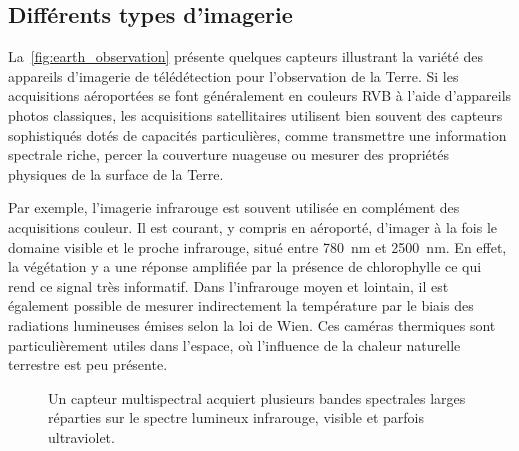 \subsection{Différents types d'imagerie}

La~\cref{fig:earth_observation} présente quelques capteurs illustrant la variété des appareils d'imagerie de télédétection pour l'observation de la Terre. Si les acquisitions aéroportées se font généralement en couleurs \gls{RVB} à l'aide d'appareils photos classiques, les acquisitions satellitaires utilisent bien souvent des capteurs sophistiqués dotés de capacités particulières, comme transmettre une information spectrale riche, percer la couverture nuageuse ou mesurer des propriétés physiques de la surface de la Terre.

Par exemple, l'imagerie infrarouge est souvent utilisée en complément des acquisitions couleur. Il est courant, y compris en aéroporté, d'imager à la fois le domaine visible et le proche infrarouge, situé entre \SI{780}{\nano\meter} et \SI{2 500}{\nano\meter}. En effet, la végétation y a une réponse amplifiée par la présence de chlorophylle ce qui rend ce signal très informatif. Dans l'infrarouge moyen et lointain, il est également possible de mesurer indirectement la température par le biais des radiations lumineuses émises selon la loi de Wien. Ces caméras thermiques sont particulièrement utiles dans l'espace, où l'influence de la chaleur naturelle terrestre est peu présente.

\begin{figure}
  \resizebox{\textwidth}{!}{
  
  }
  \caption{Un capteur multispectral acquiert plusieurs bandes spectrales larges réparties sur le spectre lumineux infrarouge, visible et parfois ultraviolet.}
  \label{fig:multispectral}
\end{figure}

